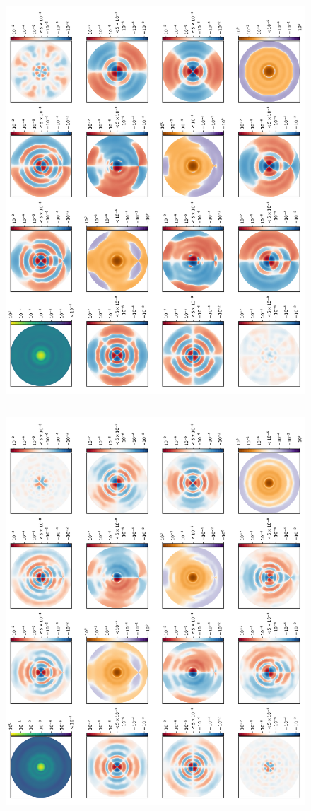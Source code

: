 \documentclass[twocolumn, trackchanges]{aastex61}
\begin{document}
\begin{figure}
\centering
\includegraphics[scale=0.4]{full_mueller_120MHz.pdf}
\par\noindent\rule{0.8\textwidth}{0.4pt}
\includegraphics[scale=0.4]{full_mueller_160MHz.pdf}

\end{figure}
\end{document}
